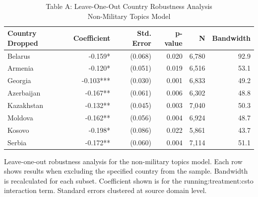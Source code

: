 \begin{table}[!t]
\caption*{
{\large Table A: Leave-One-Out Country Robustness Analysis} \\ 
{\small Non-Military Topics Model}
} 
\fontsize{12.0pt}{14.4pt}\selectfont
\begin{tabular*}{\linewidth}{@{\extracolsep{\fill}}lrrrrr}
\toprule
Country Dropped & Coefficient & Std. Error & p-value & N & Bandwidth \\ 
\midrule\addlinespace[2.5pt]
Belarus & -0.159* & (0.068) & 0.020 & 6,780 & 92.9 \\ 
Armenia & -0.120* & (0.051) & 0.019 & 6,516 & 53.1 \\ 
Georgia & -0.103*** & (0.030) & 0.001 & 6,833 & 49.2 \\ 
Azerbaijan & -0.167** & (0.061) & 0.006 & 6,302 & 48.8 \\ 
Kazakhstan & -0.132** & (0.045) & 0.003 & 7,040 & 50.3 \\ 
Moldova & -0.162** & (0.056) & 0.004 & 6,924 & 48.7 \\ 
Kosovo & -0.198* & (0.086) & 0.022 & 5,861 & 43.7 \\ 
Serbia & -0.172** & (0.060) & 0.004 & 7,114 & 51.1 \\ 
\bottomrule
\end{tabular*}
\begin{minipage}{\linewidth}
Leave-one-out robustness analysis for the non-military topics model. Each
row shows results when excluding the specified country from the sample.
Bandwidth is recalculated for each subset. Coefficient shown is for the
running:treatment:csto interaction term. Standard errors clustered at source
domain level.\\
\end{minipage}
\end{table}

